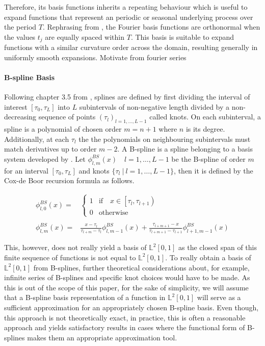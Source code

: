 \documentclass[11pt,twoside,a4paper]{article}
\begin{document}
	Therefore, its basis functions inherits a repeating behaviour which is useful to expand functions that represent an periodic or seasonal underlying process over the period $T$. Rephrasing from \cite{ramsay_functional_2005}, the Fourier basis functions are orthonormal when the values $t_j$ are equally spaced within $T$. This basis is suitable to expand functions with a similar curvature order across the domain, resulting generally in uniformly smooth expansions.  {\color{blue} Motivate from fourier series}

	\paragraph{B-spline Basis} Following chapter 3.5 from \cite{ramsay_functional_2005}, splines are defined by first dividing the interval of interest $[\tau_0, \tau_L]$ into $L$ subintervals of non-negative length divided by a non-decreasing sequence of points $(\tau_l)_{l = 1,\dots, L-1}$ called knots. On each subinterval, a spline is a polynomial of chosen order $m = n+1$ where $n$ is its degree. Additionally, at each $\tau_l$ the the polynomials on neighbouring subintervals must match derivatives up to order $m-2$.
	A B-spline is a spline belonging to a basis system developed by \cite{de_boor_practical_1978}. Let $\phi_{l,m}^{BS}(x) \quad l = 1,\dots,L-1$ be the B-spline of order $m$ for an interval $[\tau_0, \tau_L]$ and knots $\{\tau_l \: \vert \: l = 1,\dots, L-1\}$, then it is defined by the Cox-de Boor recursion formula as follows. 

	\begin{equation}
		\begin{split}
			\phi_{l,0}^{BS}(x) = &
			\begin{cases}
				1 & \text{if} \quad x \in \left[\tau_l, \tau_{l+1}\right)\\
				0 & \text{otherwise}
			\end{cases}\\ \\
			\phi_{l,m}^{BS}(x) = &\frac{x - \tau_l}{\tau_{l+m} - \tau_l} \phi_{l,m-1}^{BS}(x) + \frac{\tau_{l+m+1} - x}{\tau_{l+m+1} - \tau_{l+1}} \phi_{l+1,m-1}^{BS}(x)
		\end{split}
	\end{equation}
	
	This, however, does not really yield a basis of $\mathbb{L}^2[0,1]$ as the closed span of this finite sequence of functions is not equal to $\mathbb{L}^2[0,1]$. To really obtain a basis of $\mathbb{L}^2[0,1]$ from B-splines, further theoretical considerations about, for example, infinite series of B-splines and specific knot choices would have to be made. As this is out of the scope of this paper, for the sake of simplicity, we will assume that a B-spline basis representation of a function in $\mathbb{L}^2[0,1]$ will serve as a sufficient approximation for an appropriately chosen B-spline basis. 
	Even though, this approach is not theoretically exact, in practice, this is often a reasonable approach and yields satisfactory results in cases where the functional form of B-splines makes them an appropriate approximation tool. 
	
\end{document}
